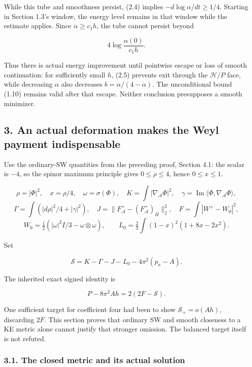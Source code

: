 \documentclass[
  10pt,
]{article}
\begin{document}
While this tube and smoothness persist, (2.4) implies
\(-d\log\alpha/dt\ge1/4\). Starting in Section 1.3's window, the energy
level remains in that window while the estimate applies. Since
\(\alpha\ge c_1h\), the tube cannot persist beyond

\[
                     4\log\frac{\alpha(0)}{c_1h}.              \tag{2.6}
\]

Thus there is actual energy improvement until pointwise escape or loss
of smooth continuation: for sufficiently small \(h\), (2.5) prevents
exit through the \(\mathcal H/P\) face, while decreasing \(\alpha\) also
decreases \(b=\alpha/(4-\alpha)\). The unconditional bound (1.10)
remains valid after that escape. Neither conclusion presupposes a smooth
minimizer.

\hypertarget{an-actual-deformation-makes-the-weyl-payment-indispensable}{%
\subsection{3. An actual deformation makes the Weyl payment
indispensable}\label{an-actual-deformation-makes-the-weyl-payment-indispensable}}

Use the ordinary-SW quantities from the preceding proof, Section 4.1:
the scalar is \(-4\), so the spinor maximum principle gives
\(0\le\rho\le4\), hence \(0\le x\le1\).

\[
 \rho=|\Phi|^2,\quad x=\rho/4,\quad \omega=\sigma(\Phi),\quad
 K=\int|\nabla_{\mathcal A}\Phi|^2,\quad
 \gamma=\operatorname{Im}\langle\Phi,\nabla_{\mathcal A}\Phi\rangle,
\] \[
 \Gamma=\int(|d\rho|^2/4+|\gamma|^2),\quad
 J=\|F_{\mathcal A}^+-(F_{\mathcal A}^+)_H\|_2^2,
 \quad F=\int|W^+-W_0|^2,
\] \[
 W_0=\tfrac12(|\omega|^2I/3-\omega\otimes\omega),\qquad
 L_0=\tfrac23\int(1-x)^2(1+8x-2x^2).
\]

Set

\[
 \mathscr S=K-\Gamma-J-L_0-4\pi^2(p_a-A).
\]

The inherited exact signed identity is

\[
              P-8\pi^2Ah=2(2F-\mathscr S).                    \tag{3.1}
\]

One sufficient target for coefficient four had been to show
\(\mathscr S_+=o(Ah)\), discarding \(2F\). This section proves that
ordinary SW and smooth closeness to a KE metric alone cannot justify
that stronger omission. The balanced target itself is not refuted.

\hypertarget{the-closed-metric-and-its-actual-solution}{%
\subsubsection{3.1. The closed metric and its actual
solution}\label{the-closed-metric-and-its-actual-solution}}
\end{document}
